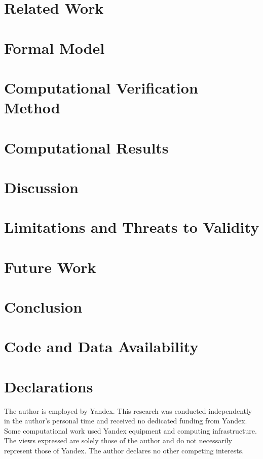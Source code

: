 \documentclass[12pt,a4paper]{article}
\theoremstyle{definition}
\begin{document}
\section{Related Work}


\section{Formal Model}


\clearpage
\section{Computational Verification Method}


\section{Computational Results}
\label{sec:computational-results}



\section{Discussion}


\section{Limitations and Threats to Validity}

\par\medskip


\section{Future Work}


\section{Conclusion}


\section{Code and Data Availability}
\label{sec:availability}


\section*{Declarations}
The author is employed by Yandex. This research was conducted independently in
the author's personal time and received no dedicated funding from Yandex. Some
computational work used Yandex equipment and computing infrastructure. The
views expressed are solely those of the author and do not necessarily represent
those of Yandex. The author declares no other competing interests.
\end{document}
